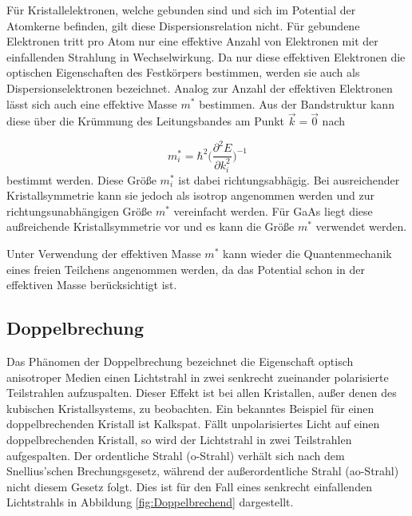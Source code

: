 Für Kristallelektronen, welche gebunden sind und sich im Potential der
Atomkerne befinden, gilt diese Dispersionsrelation nicht. Für gebundene
Elektronen tritt pro Atom nur eine effektive Anzahl von Elektronen mit der einfallenden
Strahlung in Wechselwirkung. Da nur diese effektiven Elektronen die optischen
Eigenschaften des Festkörpers bestimmen, werden sie auch als Dispersionselektronen
bezeichnet. Analog zur Anzahl der effektiven Elektronen lässt sich auch eine
effektive Masse $m^*$ bestimmen. Aus der Bandstruktur kann diese über die Krümmung des
Leitungsbandes am Punkt $\vec{k}=\vec{0}$ nach

\begin{equation}
  m^*_i=\hbar^2\Big(\frac{\partial^2 E}{\partial k^2_i} \Big)^{-1}
\end{equation}
bestimmt werden. Diese Größe $m^*_i$ ist dabei richtungsabhägig. Bei ausreichender
Kristallsymmetrie kann sie jedoch als isotrop angenommen werden und zur richtungsunabhängigen
Größe $m^*$ vereinfacht werden. Für GaAs liegt diese außreichende Kristallsymmetrie vor und es kann
die Größe $m^*$ verwendet werden.

Unter Verwendung der effektiven Masse $m^*$ kann wieder die Quantenmechanik eines
freien Teilchens angenommen werden, da das Potential schon in der effektiven Masse
berücksichtigt ist.

\subsection{Doppelbrechung}
Das Phänomen der Doppelbrechung bezeichnet die Eigenschaft optisch anisotroper Medien einen Lichtstrahl in
zwei senkrecht zueinander polarisierte Teilstrahlen aufzuspalten. Dieser Effekt ist bei allen Kristallen, außer
denen des kubischen Kristallsystems, zu beobachten. Ein bekanntes Beispiel für einen doppelbrechenden Kristall ist
Kalkspat.
Fällt unpolarisiertes Licht auf einen doppelbrechenden Kristall, so wird der
Lichtstrahl in zwei Teilstrahlen aufgespalten. Der ordentliche Strahl (o-Strahl)
verhält sich nach dem Snellius'schen Brechungsgesetz, während der außerordentliche Strahl
(ao-Strahl) nicht diesem Gesetz folgt. Dies ist für den Fall eines senkrecht
einfallenden Lichtstrahls in Abbildung \ref{fig:Doppelbrechend} dargestellt.

